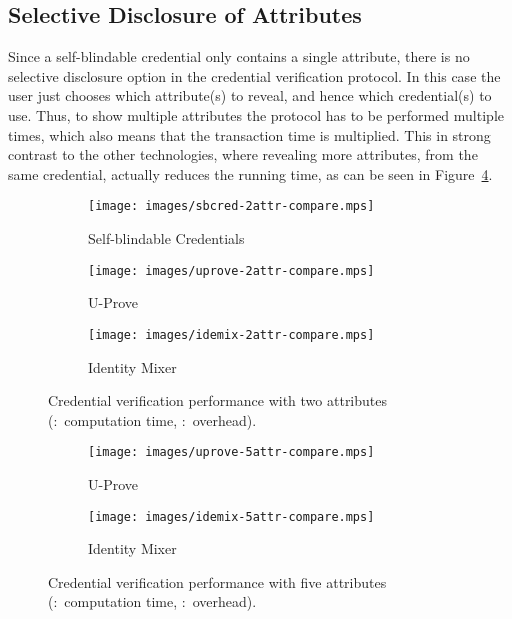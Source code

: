 \subsection{Selective Disclosure of Attributes}

Since a self-blindable credential only contains a single attribute, there is no
selective disclosure option in the credential verification protocol. In this
case the user just chooses which attribute(s) to reveal, and hence which
credential(s) to use. Thus, to show multiple attributes the protocol has to be
performed multiple times, which also means that the transaction time is
multiplied. This in strong contrast to the other technologies, where revealing
more attributes, from the same credential, actually reduces the running time, as
can be seen in Figure~\ref{fig:2attr-comparison}.

\begin{figure}[ht]
  \centering
  \begin{subfigure}[b]{0.33\textwidth}
    \texttt{[image: images/sbcred-2attr-compare.mps]}
    \caption{Self-blindable Credentials}
    \label{fig:uprove-2attr}
  \end{subfigure}
  \begin{subfigure}[b]{0.32\textwidth}
    \texttt{[image: images/uprove-2attr-compare.mps]}
    \caption{U-Prove}
    \label{fig:uprove-2attr}
  \end{subfigure}
  \begin{subfigure}[b]{0.32\textwidth}
    \texttt{[image: images/idemix-2attr-compare.mps]}
    \caption{Identity Mixer}
    \label{fig:idemix-2attr}
  \end{subfigure}

  \caption[Credential verification performance with two attributes.]{
    Credential verification performance with two attributes
    (:~computation time,
      :~overhead).}
  \label{fig:2attr-comparison}
\end{figure}

\begin{figure}[ht]
  \centering
  \begin{subfigure}[b]{0.48\textwidth}
    \texttt{[image: images/uprove-5attr-compare.mps]}
    \caption{U-Prove}
    \label{fig:uprove-5attr}
  \end{subfigure}
  \begin{subfigure}[b]{0.48\textwidth}
    \texttt{[image: images/idemix-5attr-compare.mps]}
    \caption{Identity Mixer}
    \label{fig:idemix-5attr}
  \end{subfigure}

  \caption[Credential verification performance with five attributes.]{
    Credential verification performance with five attributes
    (:~computation time,
      :~overhead).}
  \label{fig:5attr-comparison}
\end{figure}

